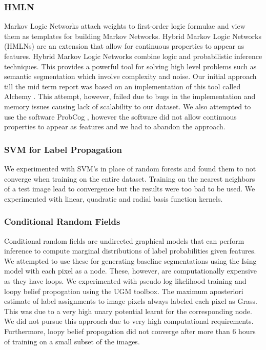 \documentclass{article} %
\begin{document}
\subsubsection{HMLN}
Markov Logic Networks \cite{Domingos06unifyinglogical} \cite{Richardson06markovlogic} attach weights to first-order logic formulae and view them as templates for building Markov Networks. Hybrid Markov Logic Networks (HMLNs)\cite{Wang_hybridmarkov} are an extension that allow for continuous properties to appear as features. Hybrid Markov Logic Networks combine logic and probabilistic inference techniques. This provides a powerful tool for solving high level problems such as semantic segmentation which involve complexity and noise. Our initial approach till the mid term report was based on an implementation of this tool called Alchemy \cite{alchemy}. This attempt, however, failed due to bugs in the implementation and memory issues causing lack of scalability to our dataset. We also attempted to use the software ProbCog \cite{conf/ifiptm/NoorianMF11}, however the software did not allow continuous properties to appear as features and we had to abandon the approach. 

\subsubsection{SVM for Label Propagation}
We experimented with SVM's in place of random forests and found them to not converge when training on the entire dataset. Training on the nearest neighbors of a test image lead to convergence but the results were too bad to be used. We experimented with linear, quadratic and radial basis function kernels.

\subsubsection{Conditional Random Fields}
Conditional random fields \cite{lafferty2001conditional} are undirected graphical models that can perform inference to compute marginal distributions of label probabilities given features.
We attempted to use these for generating baseline segmentations using the Ising model with each pixel as a node.
These, however, are computationally expensive as they have loops.
We experimented with pseudo log likelihood training and loopy belief propogation using the UGM toolbox\cite{UGMSoftware}.
The maximum aposteriori estimate of label assignments to image pixels always labeled each pixel as Grass.
This was due to a very high unary potential learnt for the corresponding node. 
We did not pursue this approach due to very high computational requirements.
Furthermore, loopy belief propogation did not converge after more than 6 hours of training on a small subset of the images.
\end{document}
